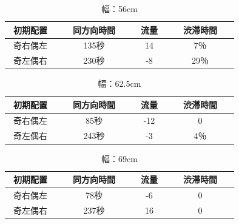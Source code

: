 \documentclass[twocolumn]{jarticle} %
\begin{document}
\begin{table}[!ht]
\begin{center}
\begin{tabular}{|c|c|c|c|c|}
\hline
初期配置　&　同方向時間　&　流量　&　渋滞時間　\\
\hline
奇右偶左　&　135秒　&　14　&　7％ \\
\hline
奇左偶右　&　230秒　&　-8　&　29％ \\
\hline
\end{tabular}
\end{center}
\caption{
幅：56cm
}
\end{table}

\begin{table}[!ht]
\begin{center}
\begin{tabular}{|c|c|c|c|c|}
\hline
初期配置　&　同方向時間　&　流量　&　渋滞時間　\\
\hline
奇右偶左　&　85秒　&　-12　&　0 \\
\hline
奇左偶右　&　243秒　&　-3　&　4％ \\
\hline
\end{tabular}
\end{center}
\caption{
幅：62.5cm
}
\end{table}

\begin{table}[!ht]
\begin{center}
\begin{tabular}{|c|c|c|c|c|}
\hline
初期配置　&　同方向時間　&　流量　&　渋滞時間　\\
\hline
奇右偶左　&　78秒　&　-6　&　0 \\
\hline
奇左偶右　&　237秒　&　16　&　0 \\
\hline
\end{tabular}
\end{center}
\caption{
幅：69cm
}
\end{table}
\end{document}
